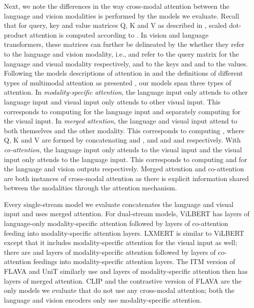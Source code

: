 \documentclass[10pt,twocolumn,letterpaper]{article}
\begin{document}
Next, we note the differences in the way cross-modal attention between the language and vision modalities is performed by the models we evaluate.
Recall that for query, key and value matrices Q, K and V as described in \cite{vaswani2017attention}, scaled dot-product attention is computed according to .
In vision and language transformers, these matrices can further be delineated by the whether they refer to the language and vision modality, i.e.,  and  refer to the query matrix for the language and visual modality respectively,  and  to the keys and  and  to the values.
Following the models descriptions of attention in \cite{vaswani2017attention} and the definitions of different types of multimodal attention as presented \cite{hendricks2021decoupling}, our models span three types of attention. In \textit{modality-specific attention}, the language input only attends to other language input and visual input only attends to other visual input. This corresponds to computing  for the language input and separately computing  for the visual input. In \textit{merged attention}, the language and visual input attend to both themselves and the other modality. This corresponds to computing , where Q, K and V are formed by concatenating  and ,  and  and  and  respectively. With \textit{co-attention}, the language input only attends to the visual input and the visual input only attends to the language input. This corresponds to computing  and  for the language and vision outputs respectively. Merged attention and co-attention are both instances of cross-modal attention as there is explicit information shared between the modalities through the attention mechanism.


Every single-stream model we evaluate concatenates the language and visual input and uses merged attention.
For dual-stream models, ViLBERT has  layers of language-only modality-specific attention followed by  layers of co-attention feeding into modality-specific attention layers.
LXMERT is similar to ViLBERT except that it includes modality-specific attention for the visual input as well; there are  and  layers of modality-specific attention followed by  layers of co-attention feedings into modality-specific attention layers.
The ITM version of FLAVA and UniT similarly use  and  layers of modality-specific attention then has  layers of merged attention.
CLIP and the contrastive version of FLAVA are the only models we evaluate that do not use any cross-modal attention; both the language and vision encoders only use modality-specific attention.
\fi
\end{document}
